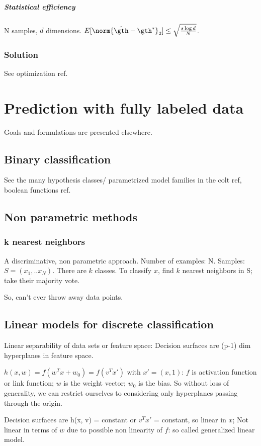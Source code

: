 \documentclass[oneside, article]{memoir}
\begin{document}
\paragraph*{Statistical efficiency}
N samples, $d$ dimensions. $E[\norm{\hat{\gth} - \gth^{*}}_2] \leq \sqrt{\frac{s \log d}{N}}$.

\subsection{Solution}
See optimization ref.

\chapter{Prediction with fully labeled data}
Goals and formulations are presented elsewhere.

\section{Binary classification}
See the many hypothesis classes/ parametrized model families in the colt ref, boolean functions ref.

\section{Non parametric methods}
\subsection{k nearest neighbors}
A discriminative, non parametric approach. Number of examples: N. Samples: $S = (x_{1}, .. x_{N})$. There are $k$ classes. To classify $x$,  find $k$ nearest neighbors in S; take their majority vote.

So, can't ever throw away data points.

\section{Linear models for discrete classification}
Linear separability of data sets or feature space: Decision surfaces are (p-1) dim hyperplanes in feature space.

$h(x, w) = f(w^{T}x + w_{0}) = f(v^{T}x')$ with $x' = (x, 1)$: $f$ is activation function or link function; $w$ is the weight vector; $w_{0}$ is the bias. So without loss of generality, we can restrict ourselves to considering only hyperplanes passing through the origin.

Decision surfaces are h(x, v) = constant or $v^{T}x'$ = constant, so linear in $x$; Not linear in terms of $w$ due to possible non linearity of $f$: so called generalized linear model.
\end{document}
